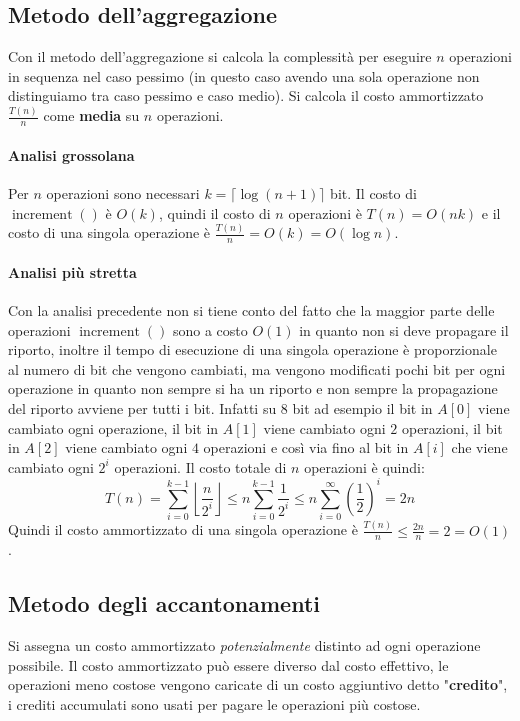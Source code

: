     \subsection{Metodo dell'aggregazione}
        Con il metodo dell'aggregazione si calcola la complessità per eseguire $n$ operazioni in sequenza nel caso pessimo (in questo caso avendo una sola operazione non distinguiamo tra caso pessimo e caso medio).\newline
        Si calcola il costo ammortizzato $\frac{T(n)}n$ come \textbf{media} su $n$ operazioni.
        \paragraph{Analisi grossolana} Per $n$ operazioni sono necessari $k=\lceil\log(n+1)\rceil$ bit. Il costo di $\operatorname{increment}()$ è $O(k)$, quindi il costo di $n$ operazioni è $T(n)=O(nk)$ e il costo di una singola operazione è $\frac{T(n)}n=O(k)=O(\log n)$.
        \paragraph{Analisi più stretta} Con la analisi precedente non si tiene conto del fatto che la maggior parte delle operazioni $\operatorname{increment}()$ sono a costo $O(1)$ in quanto non si deve propagare il riporto, inoltre il tempo di esecuzione di una singola operazione è proporzionale al numero di bit che vengono cambiati, ma vengono modificati pochi bit per ogni operazione in quanto non sempre si ha un riporto e non sempre la propagazione del riporto avviene per tutti i bit. Infatti su $8$ bit ad esempio il bit in $A[0]$ viene cambiato ogni operazione, il bit in $A[1]$ viene cambiato ogni $2$ operazioni, il bit in $A[2]$ viene cambiato ogni $4$ operazioni e così via fino al bit in $A[i]$ che viene cambiato ogni $2^i$ operazioni. \newline
        Il costo totale di $n$ operazioni è quindi:
        $$
            T(n)=\sum_{i=0}^{k-1}\left\lfloor\frac{n}{2^i}\right\rfloor\leq n\sum_{i=0}^{k-1}\frac{1}{2^i}\leq n\sum_{i=0}^{\infty}\left(\frac{1}{2}\right)^i=2n
        $$
        Quindi il costo ammortizzato di una singola operazione è $\frac{T(n)}n\leq \frac{2n}n=2=O(1)$.
    \subsection{Metodo degli accantonamenti}
        Si assegna un costo ammortizzato \textit{potenzialmente} distinto ad ogni operazione possibile.\newline
        Il costo ammortizzato può essere diverso dal costo effettivo, le operazioni meno costose vengono caricate di un costo aggiuntivo detto "\textbf{credito}", i crediti accumulati sono usati per pagare le operazioni più costose.
